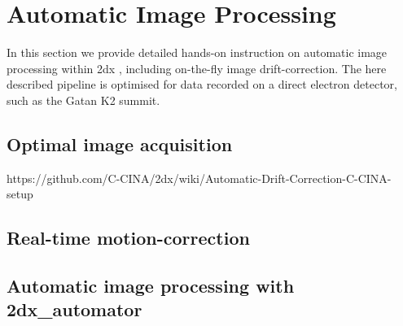 \section{Automatic Image Processing}

In this section we provide detailed hands-on instruction on automatic image processing within 2dx \cite{scherer20142dx_automator}, including on-the-fly image drift-correction. The here described pipeline is optimised for data recorded on a direct electron detector, such as the Gatan K2 summit. 

\subsection{Optimal image acquisition}

https://github.com/C-CINA/2dx/wiki/Automatic-Drift-Correction-C-CINA-setup

\subsection{Real-time motion-correction}

\subsection{Automatic image processing with 2dx\_automator}